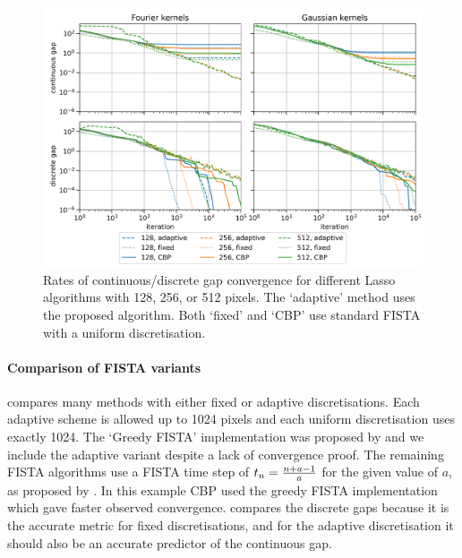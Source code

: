 \documentclass[10pt,a4paper,onecolumn]{article}
\numberwithin{equation}{section}
\newcommand*{\vart}[1]{%
	\IfEqCase{#1}{%
		{0}{s}%
		{1}{t}%
	}[t#1]%
}
\begin{document}
\begin{figure}[H]\centering
	\includegraphics[width=.84\textwidth]{lasso_ndofs_convergence}
	\caption{Rates of continuous/discrete gap convergence for different Lasso algorithms with 128, 256, or 512 pixels. The `adaptive' method uses the proposed algorithm. Both `fixed' and `CBP' use standard FISTA with a uniform discretisation.}\label{fig: convergence with ndofs}
\end{figure}

\paragraph{Comparison of FISTA variants}
 compares many methods with either fixed or adaptive discretisations. Each adaptive scheme is allowed up to 1024 pixels and each uniform discretisation uses exactly 1024. The `Greedy FISTA' implementation was proposed by \citet{Liang2018} and we include the adaptive variant despite a lack of convergence proof. The remaining FISTA algorithms use a FISTA time step of $\vart1_n = \frac{n+a-1}{a}$ for the given value of $a$, as proposed by \citet{Chambolle2015}. In this example CBP used the greedy FISTA implementation which gave faster observed convergence.  compares the discrete gaps because it is the accurate metric for fixed discretisations, and for the adaptive discretisation it should also be an accurate predictor of the continuous gap. 
\end{document}
